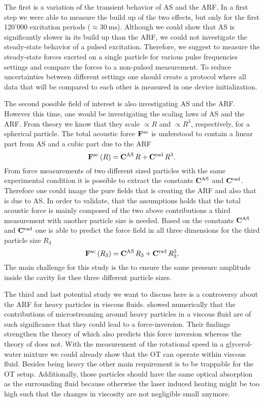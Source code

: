 The first is a variation of the transient behavior of AS and the ARF. In a 
first step we were able to measure the build up of the two effects, but only 
for the first 120'000 excitation periods ($\approx \SI{30}{\ms}$). Although we 
could show that AS is significantly slower in its build up than the ARF, we 
could not investigate the steady-state behavior of a pulsed excitation. 
Therefore, we suggest to measure the steady-state forces exerted on a single 
particle for various pulse frequencies settings and compare the forces to a 
non-pulsed measurement. To reduce uncertainties between different settings one 
should create a protocol where all data that will be compared to each other is 
measured in one device initialization.

The second possible field of interest is also investigating AS and the ARF.  
However this time, one would be investigating the scaling laws of AS and the 
ARF. From theory we know that they scale $\propto R$ and $\propto R^{3}$, 
respectively, for a spherical particle. The total acoustic force 
$\vb{F}^{\mathrm{ac}}$ is understood to contain a linear part from AS and a 
cubic part due to the ARF
\begin{equation}
  \vb{F}^{\mathrm{ac}}\left( R \right) = \vb{C}^{\mathrm{AS}}\,R + 
  \vb{C}^{\mathrm{rad}}\,R^{3}.
\end{equation}
From force measurements of two different sized particles with the same 
experimental condition it is possible to extract the constants 
$\vb{C}^{\mathrm{AS}}$ and $\vb{C}^{\mathrm{rad}}$. Therefore one could image the pure 
fields that is creating the ARF and also that is due to AS. In order to 
validate, that the assumptions holds that the total acoustic force is mainly 
composed of the two above contributions a third measurement with another 
particle size is needed. Based on the constants $\vb{C}^{\mathrm{AS}}$ and 
$\vb{C}^{\mathrm{rad}}$ one is able to predict the force field in all three 
dimensions for the third particle size $R_{3}$
\begin{equation}
  \vb{F}^{\mathrm{ac}}\left( R_{3} \right) = \vb{C}^{\mathrm{AS}}\,R_{3} + 
  \vb{C}^{\mathrm{rad}}\,R^{3}_{3}.
\end{equation}
The main challenge for this study is the to ensure the same pressure amplitude 
inside the cavity for thee three different particle sizes.

The third and last potential study we want to discuss here is a controversy 
about the ARF for heavy particles in viscous fluids.  showed 
numerically that the contributions of microstreaming around heavy particles in 
a viscous fluid are of such significance that they could lead to a 
force-inversion. Their findings strengthen the theory of 
 which also predicts this force inversion whereas the 
theory of  does not. With the measurement of the rotational 
speed in a glycerol-water mixture we could already show that the OT can operate 
within viscous fluid. Besides being heavy the other main requirement is to be 
trappable for the OT setup. Additionally, those particles should have the same 
optical absorption as the surrounding fluid because otherwise the laser induced 
heating might be too high such that the changes in viscosity are not negligible 
small anymore.

